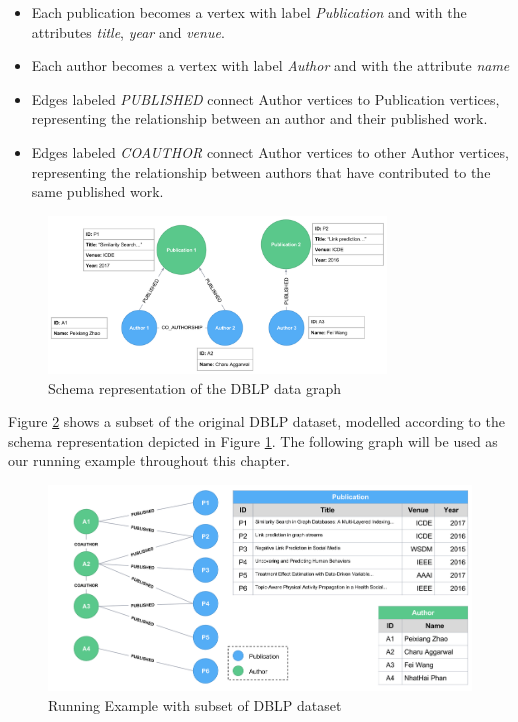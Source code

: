 \begin{itemize}
\item Each publication becomes a vertex with label \emph{Publication} and with the attributes \emph{title}, \emph{year} and \emph{venue}.
\item Each author becomes a vertex with label \emph{Author} and with the attribute \emph{name}
\item Edges labeled \emph{PUBLISHED} connect Author vertices to Publication vertices, representing the relationship between an author and their published work.
\item Edges labeled \emph{COAUTHOR} connect Author vertices to other Author vertices, representing the relationship between authors that have contributed to the same published work.
\end{itemize}

\begin{figure}[ht]
\centering
\caption{Schema representation of the DBLP data graph}
\label{fig:figure25}
\includegraphics[width=0.8\textwidth]{images/dblp_schema_with_attr.png}
\end{figure}

Figure \ref{fig:figure26} shows a subset of the original DBLP dataset, modelled according to the schema representation depicted in Figure \ref{fig:figure25}. The following graph will be used as our running example throughout this chapter.

\begin{figure}[ht]
\centering
\caption{Running Example with subset of DBLP dataset}
\label{fig:figure26}
\includegraphics[width=1\textwidth]{images/running_example.png}
\end{figure}

